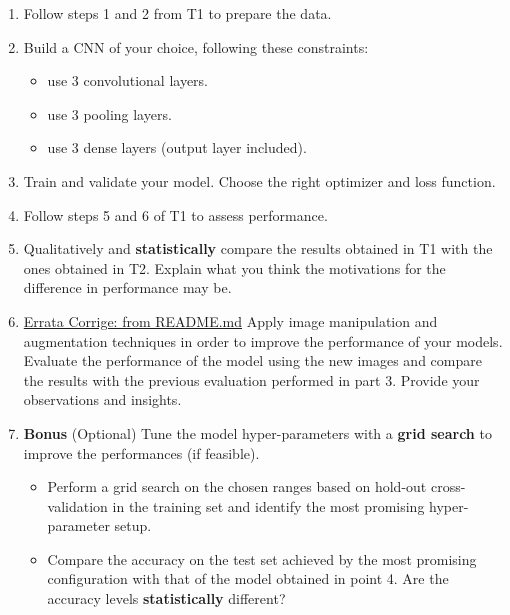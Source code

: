 \documentclass[11pt]{scrartcl}
\begin{document}
\begin{enumerate}
\item Follow steps 1 and 2 from T1 to prepare the data.

\item Build a CNN of your choice, following these constraints: 

	\begin{itemize}
	\item use 3 convolutional layers.
	\item use 3 pooling layers.
	\item use 3 dense layers (output layer included).
	\end{itemize}

\item Train and validate your model. Choose the right optimizer and loss function. 

\item Follow steps 5 and 6 of T1 to assess performance.

\item Qualitatively and \textbf{statistically} compare the results 
obtained in T1 with the ones obtained in T2. 
Explain what you think the motivations for the difference in performance may be.

\item \underline{Errata Corrige: from README.md} 
Apply image manipulation and augmentation techniques in order to improve the performance
of your models. Evaluate the performance of the model using the new images and compare the
results with the previous evaluation performed in part 3. Provide your observations and insights.

\item \textbf{Bonus} (Optional) 
Tune the model hyper-parameters with a \textbf{grid search} 
to improve the performances (if feasible).

	\begin{itemize}
	\item Perform a grid search on the chosen ranges based on hold-out cross-validation 
	in the training set and identify the most promising hyper-parameter setup.

	\item Compare the accuracy on the test set achieved by the most promising configuration 
	with that of the model obtained in point 4. 
	Are the accuracy levels \textbf{statistically} different?
	\end{itemize}
\end{enumerate}
\end{document}
